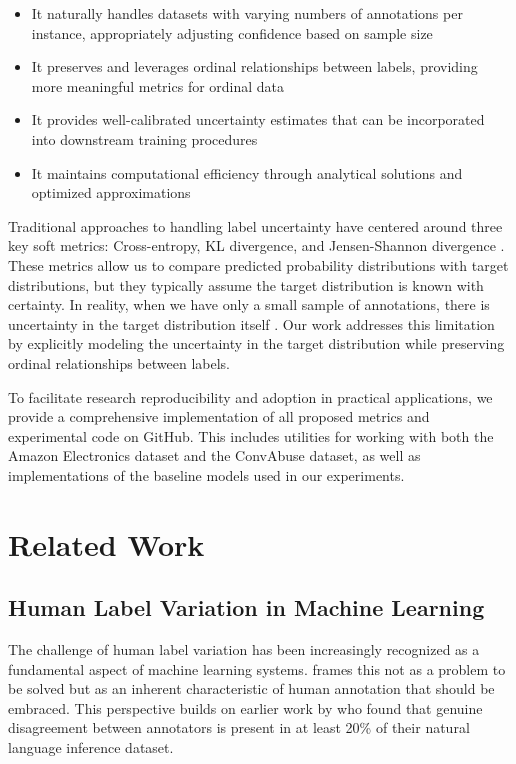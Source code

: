 \documentclass[journal]{IEEEtran}
\begin{document}
\begin{itemize}
    \item It naturally handles datasets with varying numbers of annotations per instance, appropriately adjusting confidence based on sample size
    \item It preserves and leverages ordinal relationships between labels, providing more meaningful metrics for ordinal data
    \item It provides well-calibrated uncertainty estimates that can be incorporated into downstream training procedures
    \item It maintains computational efficiency through analytical solutions and optimized approximations
\end{itemize}

Traditional approaches to handling label uncertainty have centered around three key soft metrics: Cross-entropy, KL divergence, and Jensen-Shannon divergence \cite{peterson2019}. These metrics allow us to compare predicted probability distributions with target distributions, but they typically assume the target distribution is known with certainty. In reality, when we have only a small sample of annotations, there is uncertainty in the target distribution itself \cite{pavlick2019}. Our work addresses this limitation by explicitly modeling the uncertainty in the target distribution while preserving ordinal relationships between labels.

To facilitate research reproducibility and adoption in practical applications, we provide a comprehensive implementation of all proposed metrics and experimental code on GitHub. This includes utilities for working with both the Amazon Electronics dataset and the ConvAbuse dataset, as well as implementations of the baseline models used in our experiments.

\section{Related Work}
\subsection{Human Label Variation in Machine Learning}
The challenge of human label variation has been increasingly recognized as a fundamental aspect of machine learning systems. \cite{plank2022} frames this not as a problem to be solved but as an inherent characteristic of human annotation that should be embraced. This perspective builds on earlier work by \cite{pavlick2019} who found that genuine disagreement between annotators is present in at least 20\% of their natural language inference dataset.
\end{document}
